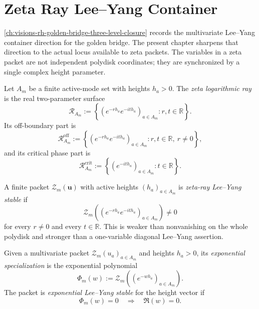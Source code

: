 \chapter{Zeta Ray Lee--Yang Container}
\label{ch:visions-rh-zeta-ray-lee-yang-container}

\autoref{ch:visions-rh-golden-bridge-three-level-closure} records the
multivariate Lee--Yang container direction for the golden bridge.  The
present chapter sharpens that direction to the actual locus available to
zeta packets.  The variables in a zeta packet are not independent
polydisk coordinates; they are synchronized by a single complex height
parameter.

\begin{definition}
\label{def:rh-zeta-logarithmic-ray}
Let $A_m$ be a finite active-mode set with heights $h_a>0$.  The
\emph{zeta logarithmic ray} is the real two-parameter surface
$$
\mathcal R_{A_m}
:=
\left\{
\left(e^{-rh_a}e^{-ith_a}\right)_{a\in A_m}
:
r,t\in\mathbb R
\right\}.
$$
Its off-boundary part is
$$
\mathcal R_{A_m}^{\mathrm{off}}
:=
\left\{
\left(e^{-rh_a}e^{-ith_a}\right)_{a\in A_m}
:
r,t\in\mathbb R,\ r\ne0
\right\},
$$
and its critical phase part is
$$
\mathcal R_{A_m}^{\mathrm{crit}}
:=
\left\{
\left(e^{-ith_a}\right)_{a\in A_m}
:
t\in\mathbb R
\right\}.
$$
\end{definition}

\begin{definition}
\label{def:rh-zeta-ray-lee-yang-stability}
A finite packet $\mathcal Z_m(\mathbf u)$ with active heights
$(h_a)_{a\in A_m}$ is \emph{zeta-ray Lee--Yang stable} if
$$
\mathcal Z_m
\left(
\left(e^{-rh_a}e^{-ith_a}\right)_{a\in A_m}
\right)
\ne0
$$
for every $r\ne0$ and every $t\in\mathbb R$.  This is weaker than
nonvanishing on the whole polydisk and stronger than a one-variable
diagonal Lee--Yang assertion.
\end{definition}

\begin{definition}
\label{def:rh-exponential-lee-yang-specialization}
Given a multivariate packet $\mathcal Z_m(u_a)_{a\in A_m}$ and heights
$h_a>0$, its \emph{exponential specialization} is the exponential
polynomial
$$
\Phi_m(w)
:=
\mathcal Z_m\left((e^{-w h_a})_{a\in A_m}\right).
$$
The packet is \emph{exponential Lee--Yang stable} for the height vector
if
$$
\Phi_m(w)=0
\quad\Longrightarrow\quad
\Re(w)=0.
$$
\end{definition}

